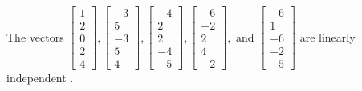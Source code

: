 \begin{exercise}
\begin{exerciseStatement}
  \end{exerciseStatement}
  \begin{exerciseAnswer}
   The vectors \(\left[\begin{array}{r}
1 \\
2 \\
0 \\
2 \\
4
\end{array}\right] , \left[\begin{array}{r}
-3 \\
5 \\
-3 \\
5 \\
4
\end{array}\right] , \left[\begin{array}{r}
-4 \\
2 \\
2 \\
-4 \\
-5
\end{array}\right] , \left[\begin{array}{r}
-6 \\
-2 \\
2 \\
4 \\
-2
\end{array}\right] , \text{ and } \left[\begin{array}{r}
-6 \\
1 \\
-6 \\
-2 \\
-5
\end{array}\right]\) are 
  	 linearly independent  .
  


  \end{exerciseAnswer}
\end{exercise}